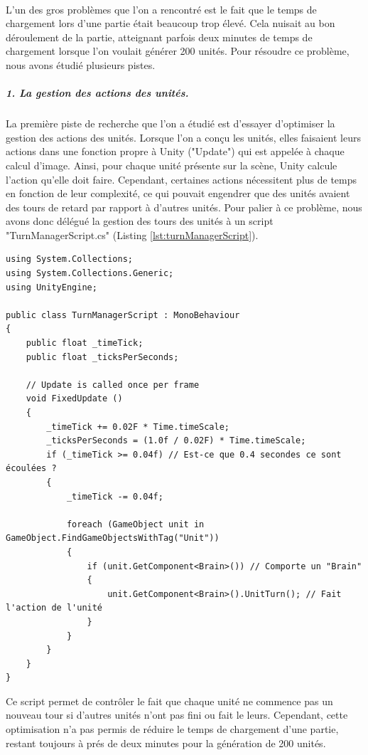 \documentclass{report}
\begin{document}
\paragraph{} L'un des gros problèmes que l'on a rencontré est le fait que le temps de chargement lors d'une partie était beaucoup trop élevé. Cela nuisait au bon déroulement de la partie, atteignant parfois deux minutes de temps de chargement lorsque l'on voulait générer 200 unités. Pour résoudre ce problème, nous avons étudié plusieurs pistes.
\subparagraph{1. La gestion des actions des unités.}La première piste de recherche que l'on a étudié est d'essayer d'optimiser la gestion des actions des unités. Lorsque l'on a conçu les unités, elles faisaient leurs actions dans une fonction propre à Unity ("Update") qui est appelée à chaque calcul d'image. Ainsi, pour chaque unité présente sur la scène, Unity calcule l'action qu'elle doit faire. Cependant, certaines actions nécessitent plus de temps en fonction de leur complexité, ce qui pouvait engendrer que des unités avaient des tours de retard par rapport à d'autres unités. \newline
Pour palier à ce problème, nous avons donc délégué la gestion des tours des unités à un script  "TurnManagerScript.cs" (Listing \ref{lst:turnManagerScript}).\newline
 \begin{lstlisting}[language={[Sharp]C},label={lst:turnManagerScript}, caption= Code du script TurnManagerScript.cs]
using System.Collections;
using System.Collections.Generic;
using UnityEngine;

public class TurnManagerScript : MonoBehaviour
{
    public float _timeTick;
    public float _ticksPerSeconds;
    
    // Update is called once per frame
	void FixedUpdate ()
    {
        _timeTick += 0.02F * Time.timeScale;
        _ticksPerSeconds = (1.0f / 0.02F) * Time.timeScale;
        if (_timeTick >= 0.04f) // Est-ce que 0.4 secondes ce sont écoulées ?
        {
            _timeTick -= 0.04f;

            foreach (GameObject unit in GameObject.FindGameObjectsWithTag("Unit"))
            {
                if (unit.GetComponent<Brain>()) // Comporte un "Brain"
                {
                    unit.GetComponent<Brain>().UnitTurn(); // Fait l'action de l'unité
                }
            }
        }
	}
}
\end{lstlisting}
Ce script permet de contrôler le fait que chaque unité ne commence pas un nouveau tour si d'autres unités n'ont pas fini ou fait le leurs.
Cependant, cette optimisation n'a pas permis de réduire le temps de chargement d'une partie, restant toujours à prés de deux minutes pour la génération de 200 unités.
\end{document}
